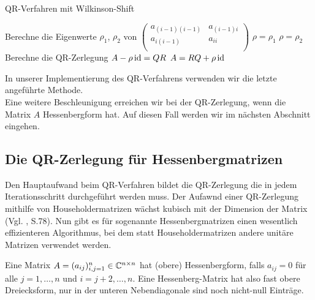\documentclass{article}
\begin{document}
\begin{algorithm}[H]
	\label{QR-Verfahren_shifts}
	\caption{QR-Verfahren mit Wilkinson-Shift}
	\begin{algorithmic}[1]
		\State Berechne die Eigenwerte $\rho_1$, $\rho_2$ von $\left(\begin{array}{rr}
			a_{(i-1)(i-1)}&a_{(i-1)i}\\
			a_{i(i-1)}&a_{ii}\\
		\end{array}\right)$
		\State $\rho = \rho_1$
		\Else
		\State $\rho = \rho_2$
		\EndIf
		\State Berechne die QR-Zerlegung $A - \rho \operatorname{id} = QR$
		\State $A = RQ + \rho \operatorname{id}$
		\EndWhile
		\EndFor
	\end{algorithmic}
\end{algorithm}


In unserer Implementierung des QR-Verfahrens verwenden wir die letzte angeführte Methode.\\
Eine weitere Beschleunigung erreichen wir bei der QR-Zerlegung, wenn die Matrix $A$ Hessenbergform hat. Auf diesen Fall werden wir im nächsten Abschnitt eingehen.

\subsection{Die QR-Zerlegung für Hessenbergmatrizen}

Den Hauptaufwand beim QR-Verfahren bildet die QR-Zerlegung die in jedem Iterationsschritt durchgeführt werden muss. Der Aufawnd einer QR-Zerlegung mithilfe von Householdermatrizen wächst kubisch mit der Dimension der Matrix (Vgl. \cite{Num}, S.78). Nun gibt es für sogenannte Hessenbergmatrizen einen wesentlich effizienteren Algorithmus, bei dem statt Householdermatrizen andere unitäre Matrizen verwendet werden.

\begin{definition}
	Eine Matrix $A = (a_{ij})_{i,j = 1}^n \in \mathbb{C}^{n \times n}$ hat (obere) Hessenbergform, falls $a_{ij} = 0$ für alle $j = 1,\dots,n$ und $i = j+2, \dots, n$. Eine Hessenberg-Matrix hat also fast obere Dreiecksform, nur in der unteren Nebendiagonale sind noch nicht-null Einträge.
\end{definition}
\end{document}
